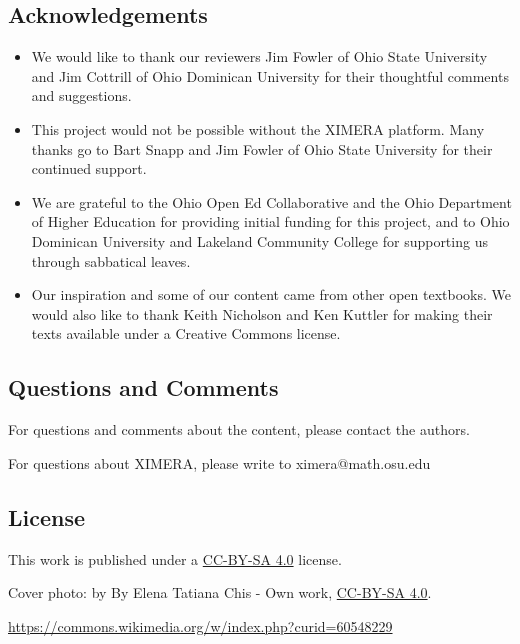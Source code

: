 \documentclass{ximera}
\begin{document}

\subsection{Acknowledgements}
\begin{itemize}
\item
We would like to thank our reviewers Jim Fowler of Ohio State University and Jim Cottrill of Ohio Dominican University for their thoughtful comments and suggestions.  
\item This project would not be possible without the XIMERA platform.  Many thanks go to Bart Snapp and Jim Fowler of Ohio State University for their continued support.   
\item We are grateful to the Ohio Open Ed Collaborative and the Ohio Department of Higher Education for providing initial funding for this project, and to Ohio Dominican University and Lakeland Community College for supporting us through sabbatical leaves.
\item Our inspiration and some of our content came from other open textbooks. We would also like to thank Keith Nicholson and Ken Kuttler for making their texts available under a Creative Commons license.
\end{itemize}

\subsection{Questions and Comments}
For questions and comments about the content, please contact the authors.

For questions about XIMERA, please write to ximera@math.osu.edu

\subsection{License}
This work is published under a \href{https://creativecommons.org/licenses/by-sa/4.0/deed.en}{CC-BY-SA 4.0} license.

Cover photo:   by By Elena Tatiana Chis - Own work, \href{https://creativecommons.org/licenses/by-sa/4.0/deed.en}{CC-BY-SA 4.0}.  

\href{https://commons.wikimedia.org/w/index.php?curid=60548229}{https://commons.wikimedia.org/w/index.php?curid=60548229}
\end{document}
